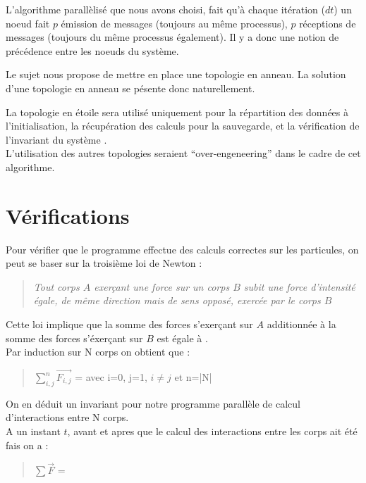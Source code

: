 \par L'algorithme parallèlisé que nous avons choisi, fait qu'à chaque itération ($dt$) un 
noeud fait $p$ émission de messages (toujours au même processus), $p$ réceptions de messages
(toujours du même processus également). Il y a donc une notion de précédence entre les
noeuds du système.\\

\par Le sujet nous propose de mettre en place une topologie en anneau.
 La solution d'une topologie en anneau se pésente donc naturellement.\\

\par La topologie en étoile sera utilisé uniquement pour la répartition des données à 
l'initialisation, la récupération des calculs pour la sauvegarde, et la vérification de
l'invariant du système .\\ 
L'utilisation des autres topologies seraient ``over-engeneering'' dans le cadre de cet
algorithme.

\section{Vérifications}

\par Pour vérifier que le programme effectue des calculs correctes sur les particules, 
on peut se baser sur la troisième loi de Newton :
\begin{quote}
\textit{Tout corps $A$ exerçant une force sur un corps $B$ subit 
une force d'intensité égale, de même direction mais de sens opposé, exercée par le corps $B$}
\end{quote}

\par Cette loi implique que la somme des forces s'exerçant sur $A$ additionnée à la somme des forces 
s'éxerçant sur $B$ est égale à  .\\
Par induction sur N corps on obtient que :
\begin{quote}
  \begin{center}
    $\sum_{i,j}^{n} \overrightarrow{F_{i,j}}$ =  avec i=0, j=1, $i\not=j$ et n=|N| 
  \end{center}
\end{quote}

\par On en déduit un invariant pour notre programme parallèle de calcul d'interactions entre N corps.\\
A un instant $t$, avant et apres que le calcul des interactions entre les corps ait été fais on a :
\begin{quote}
  \begin{center}
    $\sum \overrightarrow{F}$ = 
  \end{center}
\end{quote}

